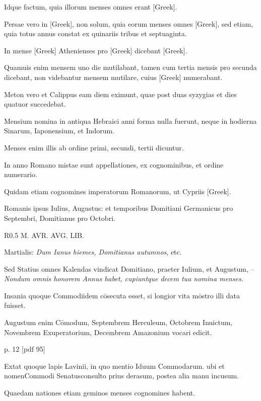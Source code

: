 Idque factum, quia
illorum menses omnes erant \textgreek{[Greek]}.

Persae vero in \textgreek{[Greek]},
non solum, quia eorum menses omnes \textgreek{[Greek]}, sed etiam, quia
totus annus constat ex quinariis tribus et septuaginta.

In mense \textgreek{[Greek]}
Athenienses pro \textgreek{[Greek]} dicebant \textgreek{[Greek]}.

Quamuis
enim mensem uno die mutilabant, tamen cum tertia mensis
pro secunda dicebant, non videbantur mensem mutilare, cuius
\textgreek{[Greek]} numerabant.

Meton vero et Calippus eam diem eximunt,
quae post duas syzygias et dies quatuor succedebat.

Mensium nomina
in antiqua Hebraici anni forma nulla fuerunt, neque in hodierna
Sinarum, Iaponensium, et Indorum.

Menses enim illis ab ordine
primi, secundi, tertii dicuntur.

In anno Romano mistae sunt appellationes,
ex cognominibus, et ordine numerario.

Quidam etiam cognomines
imperatorum Romanorum, ut Cypriis \textgreek{[Greek]}.

Romanis ipsus Iulius, Augustus: et temporibus Domitiani
Germanicus pro Septembri, Domitianus pro Octobri.

\begin{wrapfigure}[16]{R}{0.5\textwidth}
  \centering
  {M. AVR. AVG. LIB.}
\end{wrapfigure}

Martialis:
 \textit{Dum Ianus hiemes, Domitianus
autumnos}, etc.

Sed Statius omnes
Kalendas vindicat Domitiano,
praeter Iulium, et Augustum,
– \textit{Nondum omnis honorem
Annus habet, cupiuntque decem tua
nomina menses.}

Insania quoque
Commodiidem cōsecuta esset, si
longior vita mōstro illi data fuisset.

Augustum enim Cōmodum,
Septembrem Herculeum, Octobrem
Inuictum, Novembrem
Exuperatorium, Decembrem
Amazonium vocari edicit.


p. 12 [pdf 95]

Extat
quoque lapis Lavinii, in quo mentio
Iduum Commodarum. ubi et
nomenCommodi Senatusconsulto prius derasum, postea alia manu
incusum.

 Quaedam nationes etiam geminos menses cognomines habent.

